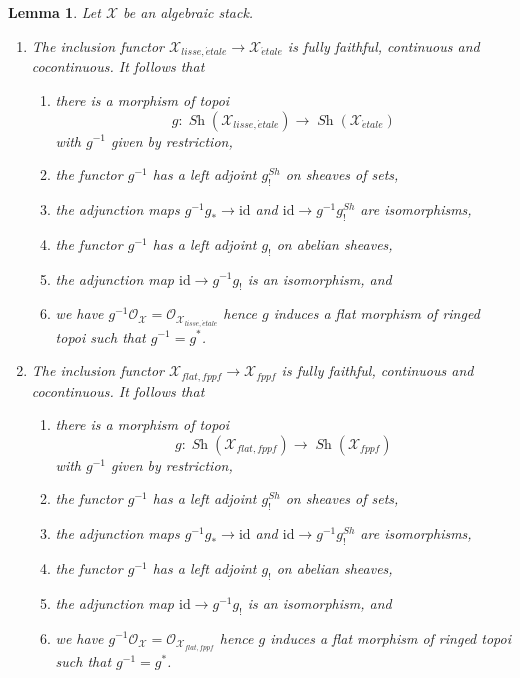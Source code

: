 \documentclass{stacks-project}
\theoremstyle{plain}
\newtheorem{lemma}[subsection]{Lemma}
\theoremstyle{definition}
\theoremstyle{remark}
\numberwithin{equation}{subsection}
\def\Sh{\mathop{\mathit{Sh}}\nolimits}
\def\etale{{\acute{e}tale}}
\begin{document}
\begin{lemma}
\label{lemma-lisse-etale}
Let $\mathcal{X}$ be an algebraic stack.
\begin{enumerate}
\item The inclusion functor
$\mathcal{X}_{lisse,\etale} \to \mathcal{X}_\etale$
is fully faithful, continuous and cocontinuous. It follows that
\begin{enumerate}
\item there is a morphism of topoi
$$
g :
\Sh(\mathcal{X}_{lisse,\etale})
\longrightarrow
\Sh(\mathcal{X}_\etale)
$$
with $g^{-1}$ given by restriction,
\item the functor $g^{-1}$ has a left adjoint $g_!^{Sh}$ on sheaves of sets,
\item the adjunction maps $g^{-1}g_* \to \text{id}$ and
$\text{id} \to g^{-1}g_!^{Sh}$ are isomorphisms,
\item the functor $g^{-1}$ has a left adjoint $g_!$ on abelian sheaves,
\item the adjunction map $\text{id} \to g^{-1}g_!$ is an isomorphism, and
\item we have $g^{-1}\mathcal{O}_\mathcal{X} =
\mathcal{O}_{\mathcal{X}_{lisse,\etale}}$ hence $g$ induces a flat
morphism of ringed topoi such that $g^{-1} = g^*$.
\end{enumerate}
\item The inclusion functor
$\mathcal{X}_{flat,fppf} \to \mathcal{X}_{fppf}$
is fully faithful, continuous and cocontinuous. It follows that
\begin{enumerate}
\item there is a morphism of topoi
$$
g :
\Sh(\mathcal{X}_{flat,fppf})
\longrightarrow
\Sh(\mathcal{X}_{fppf})
$$
with $g^{-1}$ given by restriction,
\item the functor $g^{-1}$ has a left adjoint $g_!^{Sh}$ on sheaves of sets,
\item the adjunction maps $g^{-1}g_* \to \text{id}$ and
$\text{id} \to g^{-1}g_!^{Sh}$ are isomorphisms,
\item the functor $g^{-1}$ has a left adjoint $g_!$ on abelian sheaves,
\item the adjunction map $\text{id} \to g^{-1}g_!$ is an isomorphism, and
\item we have $g^{-1}\mathcal{O}_\mathcal{X} =
\mathcal{O}_{\mathcal{X}_{flat,fppf}}$ hence $g$ induces a flat
morphism of ringed topoi such that $g^{-1} = g^*$.
\end{enumerate}
\end{enumerate}
\end{lemma}
\end{document}
